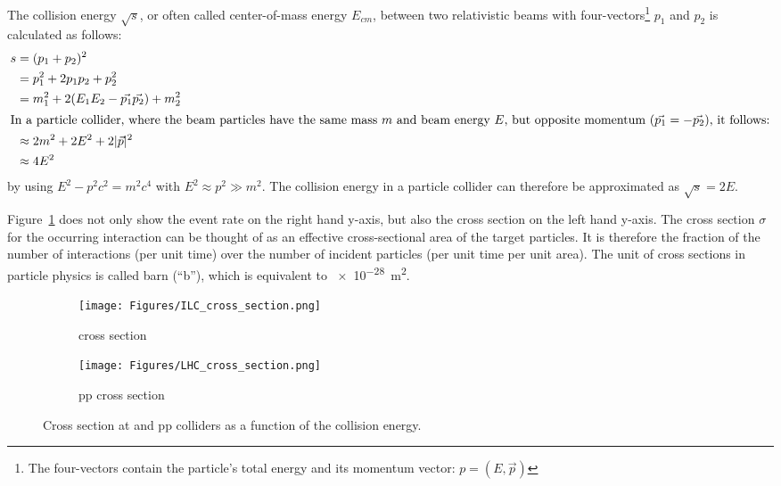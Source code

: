 The collision energy $\sqrt{s}$, or often called center-of-mass energy $E_{cm}$, between two relativistic beams with four-vectors\footnote{The four-vectors contain the particle's total energy and its momentum vector: $p = (E, \vec{p})$} $p_1$ and $p_2$ is calculated as follows:
\begin{align*}
 s &= (p_1+p_2)^2\\
 &=p_1^2+2p_1p_2+p_2^2\\
 &=m_1^2+2(E_1E_2-\vec{p_1}\vec{p_2})+m_2^2\\
\intertext{In a particle collider, where the beam particles have the same mass $m$ and beam energy $E$, but opposite momentum ($\vec{p_1}=-\vec{p_2}$), it follows:}
&\approx2m^2+2E^2+2|\vec{p}|^2\\
&\approx4E^2
\end{align*}
by using $E^2-p^2c^2=m^2c^4$ with $E^2\approx p^2 \gg m^2$.
The collision energy in a particle collider can therefore be approximated as $\sqrt{s}=2E$.

Figure~\ref{fig:Cross_sections} does not only show the event rate on the right hand y-axis, but also the cross section on the left hand y-axis.
The cross section $\sigma$ for the occurring interaction can be thought of as an effective cross-sectional area of the target particles.
It is therefore the fraction of the number of interactions (per unit time) over the number of incident particles (per unit time per unit area).
The unit of cross sections in particle physics is called barn (``b''), which is equivalent to \SI{e-28}{\meter\squared}.

\begin{figure}[h!]
\centering
\begin{subfigure}[b]{0.4\textwidth}
\texttt{[image: Figures/ILC\_cross\_section.png]}
\caption{\positron \electron cross section~\cite{ILC_cross}}
\end{subfigure}
\begin{subfigure}[b]{0.4\textwidth}
\texttt{[image: Figures/LHC\_cross\_section.png]}
\caption{pp cross section~\cite{LHC_cross}}
\end{subfigure}
\caption[Cross sections for ILC and LHC]{Cross section at \positron \electron and pp colliders as a function of the collision energy. }%
\label{fig:Cross_sections}
\end{figure}

